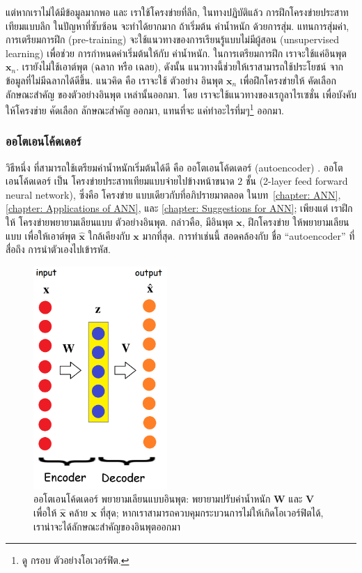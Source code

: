 แต่หากเราไม่ได้มีข้อมูลมากพอ และ เราใช้โครงข่ายที่ลึก, ในทางปฏิบัติแล้ว การฝึกโครงข่ายประสาทเทียมแบบลึก ในปัญหาที่ซับซ้อน จะทำได้ยากมาก ถ้าเริ่มต้น ค่าน้ำหนัก ด้วยการสุ่ม.
แทนการสุ่มค่า, การเตรียมการฝึก (pre-training) จะใช้แนวทางของการเรียนรู้แบบไม่มีผู้สอน (unsupervised learning) เพื่อช่วย การกำหนดค่าเริ่มต้นให้กับ ค่าน้ำหนัก.
ในการเตรียมการฝึก เราจะใช้แค่อินพุต $\mathbf{x}_n$.
เรายังไม่ใช้เอาต์พุต (ฉลาก หรือ เฉลย), ดังนั้น แนวทางนี้ช่วยให้เราสามารถใช้ประโยชน์ จากข้อมูลที่ไม่มีฉลากได้ดีขึ้น.
แนวคิด คือ เราจะใช้ ตัวอย่าง อินพุต $\mathbf{x}_n$
 เพื่อฝึกโครงข่ายให้ คัดเลือก ลักษณะสำคัญ ของตัวอย่างอินพุต เหล่านั้นออกมา.
โดย เราจะใช้แนวทางของเรกูลาไรเซชั่น เพื่อบังคับให้โครงข่าย คัดเลือก ลักษณะสำคัญ ออกมา, แทนที่จะ แค่ทำอะไรทึ่มๆ\footnote{
ดู กรอบ ตัวอย่างโอเวอร์ฟิต.
} ออกมา.

\subsubsection{ออโตเอนโค้ดเดอร์}
\label{deep: autoencoder}
วิธีหนึ่ง ที่สามารถใช้เตรียมค่าน้ำหนักเริ่มต้นได้ดี คือ ออโตเอนโค้ดเดอร์ (autoencoder)  .
ออโตเอนโค้ดเดอร์ เป็น โครงข่ายประสาทเทียมแบบจ่ายไปข้างหน้าขนาด $2$ ชั้น (2-layer feed forward neural network), ซึ่งคือ โครงข่าย แบบเดียวกับที่อภิปรายมาตลอด ในบท~\ref{chapter: ANN}, \ref{chapter: Applications of ANN}, และ \ref{chapter: Suggestions for ANN};
เพียงแต่ เราฝึกให้ โครงข่ายพยายามเลียนแบบ ตัวอย่างอินพุต.
กล่าวคือ, มีอินพุต $\mathbf{x}$, ฝึกโครงข่าย ให้พยายามเลียนแบบ เพื่อให้เอาต์พุต $\hat{\mathbf{x}}$ ใกล้เคียงกับ $\mathbf{x}$ มากที่สุด.
การทำเช่นนี้ สอดคล้องกับ ชื่อ ``autoencoder'' ที่สื่อถึง การนำตัวเองไปเข้ารหัส.

%
\begin{figure}
\begin{center}
\includegraphics[width=2in]{04ANNDeep/Autoencoder.png}
\end{center}
\caption{ออโตเอนโค้ดเดอร์ พยายามเลียนแบบอินพุต: พยายามปรับค่าน้ำหนัก $\mathbf{W}$ และ $\mathbf{V}$ เพื่อให้ $\hat{\mathbf{x}}$ คล้าย $\mathbf{x}$ ที่สุด;
หากเราสามารถควบคุมกระบวนการไม่ให้เกิดโอเวอร์ฟิตได้, เราน่าจะได้ลักษณะสำคัญของอินพุตออกมา}
\label{fig: deep autoencoder}
\end{figure}
%

